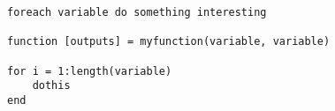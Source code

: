 \begin{lstlisting}[caption = Example of possible code]
% Sample code!
foreach variable do something interesting

function [outputs] = myfunction(variable, variable)

for i = 1:length(variable)
    dothis
end

\end{lstlisting}